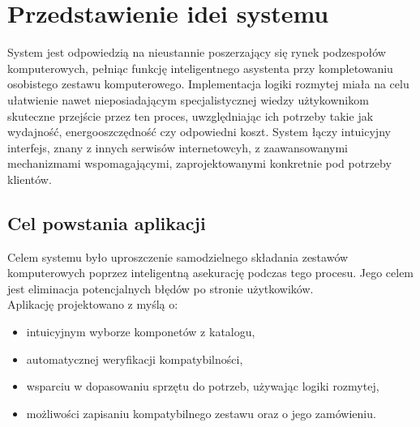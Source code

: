 \documentclass[a4paper,twoside,12pt]{book}
\begin{document}





%      
\section{Przedstawienie idei systemu}

System jest odpowiedzią na nieustannie poszerzający się rynek podzespołów komputerowych, pełniąc funkcję inteligentnego asystenta przy kompletowaniu osobistego zestawu komputerowego. Implementacja logiki rozmytej miała na celu ułatwienie nawet nieposiadającym specjalistycznej wiedzy użtykownikom skuteczne przejście przez ten proces, uwzględniając ich potrzeby takie jak wydajność, energooszczędność czy odpowiedni koszt. System łączy intuicyjny interfejs, znany z innych serwisów internetowcyh, z zaawansowanymi mechanizmami wspomagającymi, zaprojektowanymi konkretnie pod potrzeby klientów.

\subsection{Cel powstania aplikacji}
Celem systemu było uproszczenie samodzielnego składania zestawów komputerowych poprzez inteligentną asekurację podczas tego procesu. Jego celem jest eliminacja potencjalnych błędów po stronie użytkowików. \\
Aplikację projektowano z myślą o:
\begin{itemize}
    \item intuicyjnym wyborze komponetów z katalogu,
    \item automatycznej weryfikacji kompatybilności,
    \item wsparciu w dopasowaniu sprzętu do potrzeb, używając logiki rozmytej,
    \item możliwości zapisaniu kompatybilnego zestawu oraz o jego zamówieniu.
\end{itemize}
\newpage
\end{document}
